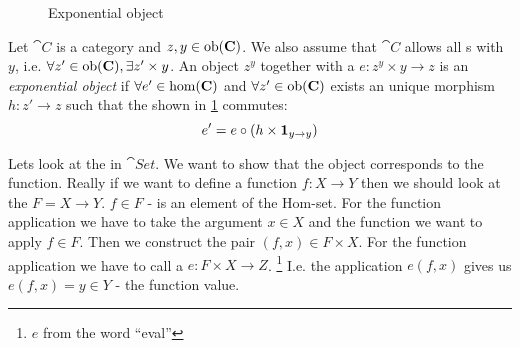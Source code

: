 \begin{definition}[Exponential]
\label{def:exponential}
\begin{figure}
  \centering
  \caption{Exponential object}
  \label{fig:exponential}
\end{figure}
Let $\cat{C}$ is a category and $z, y \in \mathrm{ob}(\mathbf{C})$. We also assume
that $\cat{C}$ allows all s with $y$, i.e.
$\forall z' \in \mathrm{ob}(\mathbf{C}), \exists z' \times y$. An object $z^y$
together with a  $e: z^y \times y \to z$ is 
an \textit{exponential object} if $\forall e' \in \mathrm{hom}(\mathbf{C})$ and
$\forall z' \in \mathrm{ob}(\mathbf{C})$ exists an
unique morphism $h: z' \to z$ such that the
 shown in \cref{fig:exponential}
commutes:
\[
e' = e \circ \left(h \times \mathbf{1}_{ y \to y } \right)
\]
\end{definition}

\begin{example}
\label{ex:exponential_set}
Lets look at the  in $\cat{Set}$. We want
to show that the object corresponds to the function. Really if we want
to define a function $f: X \to Y$ then we should look at the
 $F = X \to Y$. $f \in F$ - is an element of the
Hom-set. For the function application we have to take the argument $x
\in X$ and the function we want to apply $f \in F$. Then we construct
the pair $(f,x) \in F \times X$. For the function application we have
to call a  $e: F \times X \to Z$.
\footnote{$e$ from the word ``eval''}
I.e. the
application $e(f, x)$ gives us $e(f, x) = y \in Y$ - the function
value. 
\end{example}


